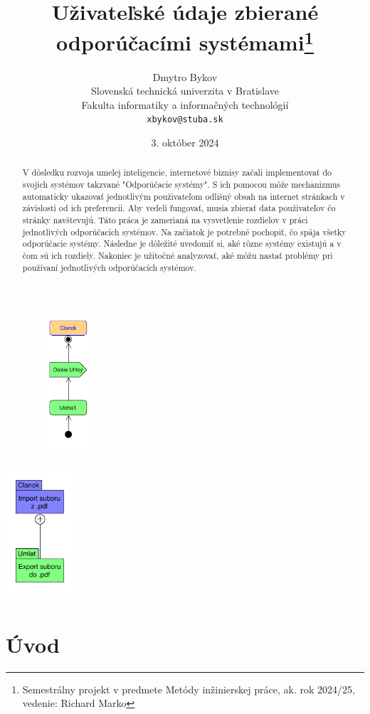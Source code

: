 \documentclass[10pt,twocolumn,twoside,slovak,a4paper]{article}
\title{Uživateľské údaje zbierané odporúčacími systémami\thanks{Semestrálny projekt v predmete Metódy inžinierskej práce, ak. rok 2024/25, vedenie: Richard Marko}} %
\author{Dmytro Bykov\\[2pt]
	{\small Slovenská technická univerzita v Bratislave}\\
	{\small Fakulta informatiky a informačných technológií}\\
	{\small \texttt{xbykov@stuba.sk}}
	}
\date{\small 3. október 2024} %
\begin{document}
\maketitle

\begin{abstract}
V dôsledku rozvoja umelej inteligencie, internetové biznisy začali implementovať do svojich systémov takzvané "Odporúčacie systémy". S ich pomocou môže mechanizmus automaticky ukazovať jednotlivým použivateľom odlišný obsah na internet stránkach v závislosti od ich preferencii. Aby vedeli fungovať, musia zbierať data použivateľov čo stránky navštevujú. Táto práca je zamerianá na vysvetlenie rozdielov v práci jednotlivých odporúčacich systémov. Na začiatok je potrebné pochopiť, čo spája všetky odporúčacie systémy. Následne je dôležité uvedomiť si, aké rôzne systémy existujú a v čom sú ich rozdiely. Nakoniec je užitočné analyzovať, aké môžu nastať problémy pri používaní jednotlivých odporúčacích systémov.
\end{abstract}

\begin{figure}
\centering
\includegraphics[height =2in,width=1in]{progres_mip.pdf}
\end{figure}
\includegraphics[height =2in,width=1in]{diagram_2.pdf}

\section{Úvod}
\end{document}
